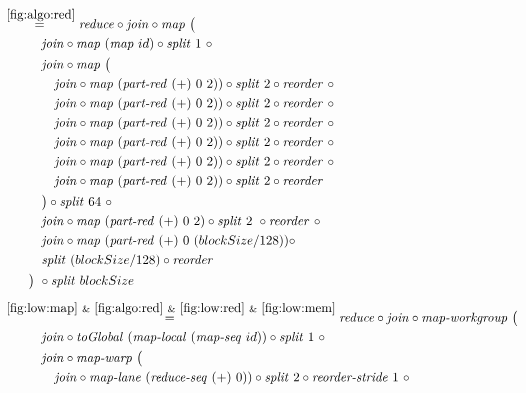 \begin{align*} 
%
  &\hspace{-2em}\quad\begin{aligned}
    &\overset{\ref{fig:algo:red}}{=\hspace{.2em}}
      \reduce \circ \join \circ \map\ \big(\\
    &\qquad\quad\join \circ \map\ (\map\ id) \circ \splitN\ 1\ \circ\\
    &\qquad\quad\join \circ \map\ \big(\\
    &\qquad\qquad \join \circ \map\ (\partRed\ (+)\ 0\ 2))\circ \splitN\ 2 \circ \reorder\ \circ\\
    &\qquad\qquad \join \circ \map\ (\partRed\ (+)\ 0\ 2))\circ \splitN\ 2 \circ \reorder\ \circ\\
    &\qquad\qquad \join \circ \map\ (\partRed\ (+)\ 0\ 2))\circ \splitN\ 2 \circ \reorder\ \circ\\
    &\qquad\qquad \join \circ \map\ (\partRed\ (+)\ 0\ 2))\circ \splitN\ 2 \circ \reorder\ \circ\\
    &\qquad\qquad \join \circ \map\ (\partRed\ (+)\ 0\ 2))\circ \splitN\ 2 \circ \reorder\ \circ\\
    &\qquad\qquad \join \circ \map\ (\partRed\ (+)\ 0\ 2))\circ \splitN\ 2 \circ \reorder\\
    &\qquad\quad\big)\circ \splitN\ 64\ \circ\\
    &\qquad\quad\join \circ \map\ (\partRed\ (+)\ 0\ 2) \circ \splitN\ 2\ \circ \reorder\ \circ \\
    &\qquad\quad\join \circ \map\ (\partRed\ (+)\ 0\ (blockSize/128)) \circ\\
    &\qquad\quad \splitN\ (blockSize/128)\circ \reorder\\
    &\qquad\big)\ \circ \splitN\ blockSize
  \end{aligned}\\[.5em]
%
  &\hspace{-2em}\quad\begin{aligned}
    &\overset{\ref{fig:low:map}\ \&\ \ref{fig:algo:red}\ \&\ \ref{fig:low:red}\ \&\ \ref{fig:low:mem}}{=\hspace{.2em}}
      \reduce \circ \join \circ \mapWorkgroup\ \big(\\
    &\qquad\quad\join \circ \toGlobal\ (\mapLocal\ (\mapSeq\ id)) \circ \splitN\ 1\ \circ\\
    &\qquad\quad\join \circ \mapWarp\ \big(\\
    &\qquad\qquad \join \circ \mapLane\ (\reduceSeq\ (+)\ 0))\circ \splitN\ 2 \circ \reorderStride\ 1\ \circ\\

\end{aligned}
\end{align*}
